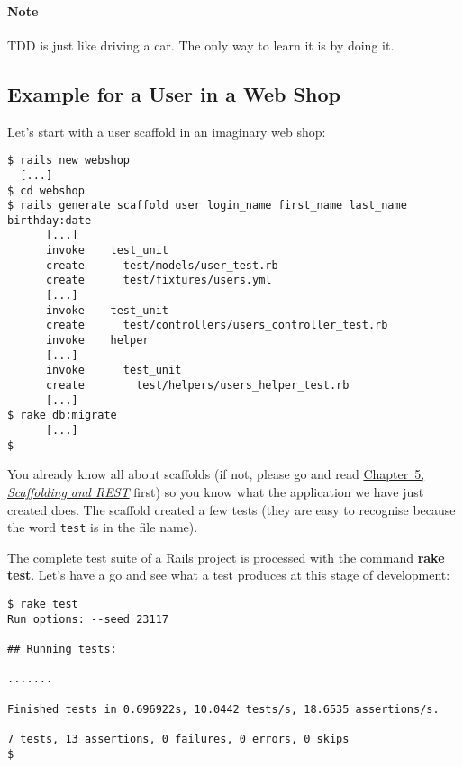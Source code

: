 \documentclass[a4paper]{book}
\begin{document}
\paragraph{Note}\label{note-38}

TDD is just like driving a car. The only way to learn it is by doing it.

\subsection{Example for a User in a Web Shop}\label{example-for-a-user-in-a-web-shop}

Let's start with a user scaffold in an imaginary web shop:

\begin{shaded}\begin{verbatim}
$ rails new webshop
  [...]
$ cd webshop
$ rails generate scaffold user login_name first_name last_name birthday:date
      [...]
      invoke    test_unit
      create      test/models/user_test.rb
      create      test/fixtures/users.yml
      [...]
      invoke    test_unit
      create      test/controllers/users_controller_test.rb
      invoke    helper
      [...]
      invoke      test_unit
      create        test/helpers/users_helper_test.rb
      [...]
$ rake db:migrate
      [...]
$
\end{verbatim}\end{shaded}

You already know all about scaffolds (if not, please go and read \hyperref[scaffolding]{Chapter~5, \emph{Scaffolding and REST}} first) so you know what the application we have just created does. The scaffold created a few tests (they are easy to recognise because the word \texttt{test} is in the file name).

The complete test suite of a Rails project is processed with the command \textbf{rake test}. Let's have a go and see what a test produces at this stage of development:

\begin{shaded}\begin{verbatim}
$ rake test
Run options: --seed 23117

## Running tests:

.......

Finished tests in 0.696922s, 10.0442 tests/s, 18.6535 assertions/s.

7 tests, 13 assertions, 0 failures, 0 errors, 0 skips
$
\end{verbatim}\end{shaded}
\end{document}
